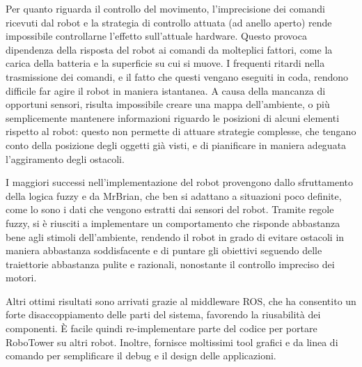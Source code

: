 Per quanto riguarda il controllo del movimento, l'imprecisione dei comandi ricevuti dal robot e la strategia di controllo attuata (ad anello aperto) rende impossibile controllarne l'effetto sull'attuale hardware. Questo provoca dipendenza della risposta del robot ai comandi da molteplici fattori, come la carica della batteria e la superficie su cui si muove. I frequenti ritardi nella trasmissione dei comandi, e il fatto che questi vengano eseguiti in coda, rendono difficile far agire il robot in maniera istantanea. A causa della mancanza di opportuni sensori, risulta impossibile creare una mappa dell'ambiente, o più semplicemente mantenere informazioni riguardo le posizioni di alcuni elementi rispetto al robot: questo non permette di attuare strategie complesse, che tengano conto della posizione degli oggetti già visti, e di pianificare in maniera adeguata l'aggiramento degli ostacoli.

I maggiori successi nell'implementazione del robot provengono dallo sfruttamento della logica fuzzy e da MrBrian, che ben si adattano a situazioni poco definite, come lo sono i dati che vengono estratti dai sensori del robot. Tramite regole fuzzy, si è riusciti a implementare un comportamento che risponde abbastanza bene agli stimoli dell'ambiente, rendendo il robot in grado di evitare ostacoli in maniera abbastanza soddisfacente e di puntare gli obiettivi seguendo delle traiettorie abbastanza pulite e razionali, nonostante il controllo impreciso dei motori.

Altri ottimi risultati sono arrivati grazie al middleware ROS, che ha consentito un forte disaccoppiamento delle parti del sistema, favorendo la riusabilità dei componenti. È facile quindi re-implementare parte del codice per portare RoboTower su altri robot. Inoltre, fornisce  moltissimi tool grafici e da linea di comando per semplificare il debug e il design delle applicazioni. 

